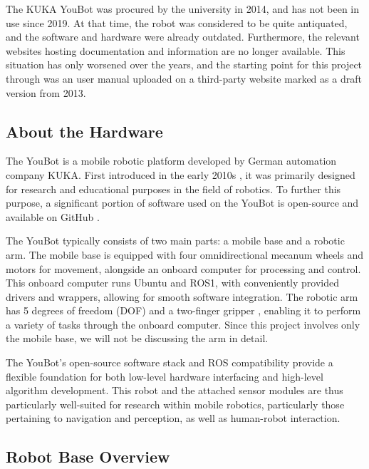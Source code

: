 \documentclass[a4paper, 12pt]{article}
\newif\ifshownotes
\newcommand{\notes}[1]{\ifshownotes\textcolor{blue}{#1}\fi}
\begin{document}
    The KUKA YouBot was procured by the university in 2014, and has not been in use since 2019. At that time, the robot was considered to be quite antiquated, and the software and hardware were already outdated. Furthermore, the relevant websites hosting documentation and information are no longer available. This situation has only worsened over the years, and the starting point for this project through was an user manual uploaded on a third-party website marked as a draft version from 2013. 

    \subsection{About the Hardware}

    The YouBot is a mobile robotic platform developed by German automation company KUKA. First introduced in the early 2010s \notes{[cite]}, it was primarily designed for research and educational purposes in the field of robotics. To further this purpose, a significant portion of software used on the YouBot is open-source and available on GitHub \notes{[cite]}. 

    The YouBot typically consists of two main parts: a mobile base and a robotic arm. The mobile base is equipped with four omnidirectional mecanum wheels and motors for movement, alongside an onboard computer for processing and control. This onboard computer runs Ubuntu and ROS1, with conveniently provided drivers and wrappers, allowing for smooth software integration. The robotic arm has 5 degrees of freedom (DOF) and a two-finger gripper \notes{[cite]}, enabling it to perform a variety of tasks through the onboard computer. Since this project involves only the mobile base, we will not be discussing the arm in detail.

    The YouBot's open-source software stack and ROS compatibility provide a flexible foundation for both low-level hardware interfacing and high-level algorithm development. This robot and the attached sensor modules are thus particularly well-suited for research within mobile robotics, particularly those pertaining to navigation and perception, as well as human-robot interaction. 

    \subsection{Robot Base Overview}

    \notes{initial inspection\\}
\end{document}
